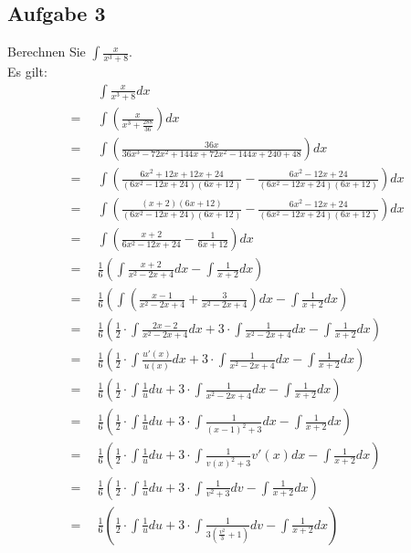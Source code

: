 \documentclass[12pt]{article}
\begin{document}
\subsection*{Aufgabe 3}
Berechnen Sie ${\displaystyle \int \frac{x}{x^3+8} }$. \\
Es gilt:
\begin{align*}
	&\int \frac{x}{x^3+8} dx \\
	= \enspace &\int \left(\frac{x}{x^3+\frac{288}{36}}\right) dx \\
	= \enspace &\int \left(\frac{36x}{36x^3 - 72x^2 + 144x + 72x^2 - 144x + 240 +48}\right) dx \\
	= \enspace &\int \left(\frac{6x^2 + 12x + 12x + 24}{(6x^2-12x+24)(6x + 12)} - \frac{6x^2 - 12x + 24}{(6x^2-12x+24)(6x + 12)}\right) dx \\
	= \enspace &\int \left(\frac{(x+2)(6x+12)}{(6x^2-12x+24)(6x + 12)} - \frac{6x^2 - 12x + 24}{(6x^2-12x+24)(6x + 12)}\right) dx \\
	= \enspace &\int \left(\frac{x+2}{6x^2-12x+24} - \frac{1}{6x+12}\right) dx \\
	= \enspace &\frac{1}{6} \left(\int \frac{x+2}{x^2-2x+4} dx - \int \frac{1}{x+2} dx\right) \\
	= \enspace &\frac{1}{6} \left(\int \left(\frac{x-1}{x^2-2x+4} + \frac{3}{x^2-2x+4}\right) dx - \int \frac{1}{x+2} dx\right) \\
	= \enspace &\frac{1}{6} \left(\frac{1}{2} \cdot \int \frac{2x-2}{x^2-2x+4} dx + 3 \cdot \int \frac{1}{x^2-2x+4} dx - \int \frac{1}{x+2} dx\right) \\
	= \enspace &\frac{1}{6} \left(\frac{1}{2} \cdot \int \frac{u'(x)}{u(x)} dx + 3 \cdot \int \frac{1}{x^2-2x+4} dx - \int \frac{1}{x+2} dx\right) \\
	= \enspace &\frac{1}{6} \left(\frac{1}{2} \cdot \int \frac{1}{u} du + 3 \cdot \int \frac{1}{x^2-2x+4} dx - \int \frac{1}{x+2} dx\right) \\
	= \enspace &\frac{1}{6} \left(\frac{1}{2} \cdot \int \frac{1}{u} du + 3 \cdot \int \frac{1}{(x-1)^2 + 3} dx - \int \frac{1}{x+2} dx\right) \\
	= \enspace &\frac{1}{6} \left(\frac{1}{2} \cdot \int \frac{1}{u} du + 3 \cdot \int \frac{1}{v(x)^2 + 3} v'(x) dx - \int \frac{1}{x+2} dx\right) \\
	= \enspace &\frac{1}{6} \left(\frac{1}{2} \cdot \int \frac{1}{u} du + 3 \cdot \int \frac{1}{v^2 + 3} dv - \int \frac{1}{x+2} dx\right) \\
	= \enspace &\frac{1}{6} \left(\frac{1}{2} \cdot \int \frac{1}{u} du + 3 \cdot \int \frac{1}{3(\frac{v^2}{3} + 1)} dv - \int \frac{1}{x+2} dx\right) \\

\end{align*}
\end{document}
